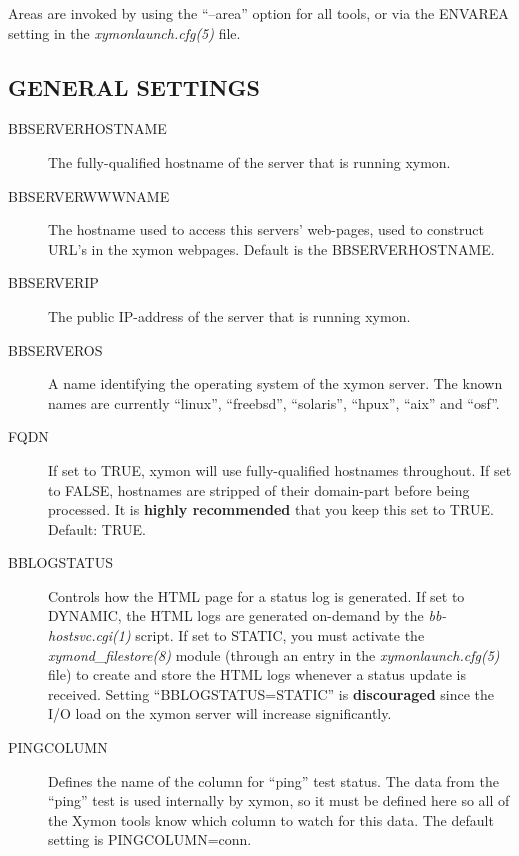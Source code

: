   Areas are invoked by using the ``--area'' option for all tools, or via the ENVAREA setting in the \emph{xymonlaunch.cfg(5)}
 file. 


 
\subsection{GENERAL SETTINGS}


 \begin{description}
\item[BBSERVERHOSTNAME] The fully-qualified hostname of the server that is running xymon. 

 

\item[BBSERVERWWWNAME] The hostname used to access this servers' web-pages, used to construct URL's in the xymon webpages. Default is the BBSERVERHOSTNAME. 

 

\item[BBSERVERIP] The public IP-address of the server that is running xymon. 

 

\item[BBSERVEROS] A name identifying the operating system of the xymon server. The known names are currently ``linux'', ``freebsd'', ``solaris'', ``hpux'', ``aix'' and ``osf''. 

 

\item[FQDN] If set to TRUE, xymon will use fully-qualified hostnames throughout. If set to FALSE, hostnames are stripped of their domain-part before being processed. It is \textbf{highly recommended}
 that you keep this set to TRUE. Default: TRUE. 

 

\item[BBLOGSTATUS] Controls how the HTML page for a status log is generated. If set to DYNAMIC, the HTML logs are generated on-demand by the \emph{bb-hostsvc.cgi(1)}
 script. If set to STATIC, you must activate the \emph{xymond\_filestore(8)}
 module (through an entry in the \emph{xymonlaunch.cfg(5)}
 file) to create and store the HTML logs whenever a status update is received. Setting ``BBLOGSTATUS=STATIC'' is \textbf{discouraged}
 since the I/O load on the xymon server will increase significantly. 

 

\item[PINGCOLUMN] Defines the name of the column for ``ping'' test status. The data from the ``ping'' test is used internally by xymon, so it must be defined here so all of the Xymon tools know which column to watch for this data. The default setting is PINGCOLUMN=conn. 


\end{description}
